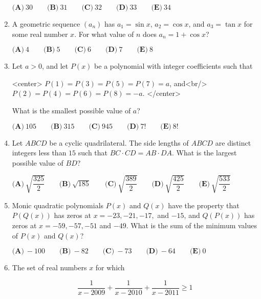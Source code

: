 \documentclass{article}
\begin{document}
\begin{enumerate}[label=\arabic*., itemsep=0.5em]
$\textbf{(A)}\ 30 \qquad \textbf{(B)}\ 31 \qquad \textbf{(C)}\ 32 \qquad \textbf{(D)}\ 33 \qquad \textbf{(E)}\ 34$\par \vspace{0.5em}\item A geometric sequence $(a_n)$ has $a_1=\sin x$, $a_2=\cos x$, and $a_3= \tan x$ for some real number $x$. For what value of $n$ does $a_n=1+\cos x$?


$\textbf{(A)}\ 4 \qquad \textbf{(B)}\ 5 \qquad \textbf{(C)}\ 6 \qquad \textbf{(D)}\ 7 \qquad \textbf{(E)}\ 8$\par \vspace{0.5em}\item Let $a > 0$, and let $P(x)$ be a polynomial with integer coefficients such that

<center>
$P(1) = P(3) = P(5) = P(7) = a$, and<br/>
$P(2) = P(4) = P(6) = P(8) = -a$.
</center>

What is the smallest possible value of $a$?

$\textbf{(A)}\ 105 \qquad \textbf{(B)}\ 315 \qquad \textbf{(C)}\ 945 \qquad \textbf{(D)}\ 7! \qquad \textbf{(E)}\ 8!$\par \vspace{0.5em}\item Let $ABCD$ be a cyclic quadrilateral. The side lengths of $ABCD$ are distinct integers less than $15$ such that $BC\cdot CD=AB\cdot DA$. What is the largest possible value of $BD$?

$\textbf{(A)}\ \sqrt{\dfrac{325}{2}} \qquad \textbf{(B)}\ \sqrt{185} \qquad \textbf{(C)}\ \sqrt{\dfrac{389}{2}} \qquad \textbf{(D)}\ \sqrt{\dfrac{425}{2}} \qquad \textbf{(E)}\ \sqrt{\dfrac{533}{2}}$\par \vspace{0.5em}\item Monic quadratic polynomials $P(x)$ and $Q(x)$ have the property that $P(Q(x))$ has zeros at $x=-23, -21, -17,$ and $-15$, and $Q(P(x))$ has zeros at $x=-59,-57,-51$ and $-49$. What is the sum of the minimum values of $P(x)$ and $Q(x)$? 

$\textbf{(A)}\ -100 \qquad \textbf{(B)}\ -82 \qquad \textbf{(C)}\ -73 \qquad \textbf{(D)}\ -64 \qquad \textbf{(E)}\ 0$\par \vspace{0.5em}\item The set of real numbers $x$ for which 


\begin{equation*}
\dfrac{1}{x-2009}+\dfrac{1}{x-2010}+\dfrac{1}{x-2011}\ge1
\end{equation*}



\end{enumerate}
\end{document}
